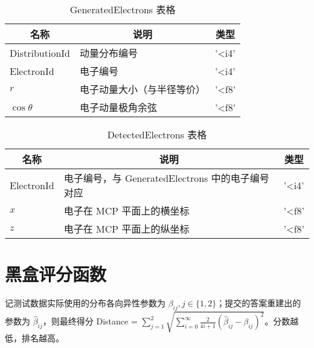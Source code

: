 \documentclass{article}
\begin{document}
\begin{table}[H]
    \caption{GeneratedElectrons 表格}
        \label{tab:GeneratedElectrons2}
        \centering
        {
            \begin{tabular}[c]{l|l|l}
                \hline
                \multicolumn{1}{c|}{\textbf{名称}} & 
                \multicolumn{1}{c|}{\textbf{说明}} & 
                \multicolumn{1}{c}{\textbf{类型}} \\
                \hline
                DistributionId & 动量分布编号 & '<i4' \\
                ElectronId & 电子编号 & '<i4' \\
                $r$ & 电子动量大小（与半径等价） & '<f8' \\
                $\cos\theta$ & 电子动量极角余弦 & '<f8' \\
                \hline
            \end{tabular}
        }
\end{table}

\begin{table}[H]
    \caption{DetectedElectrons 表格}
        \label{tab:DetectedElectrons2}
        \centering
        {
            \begin{tabular}[c]{l|l|l}
                \hline
                \multicolumn{1}{c|}{\textbf{名称}} & 
                \multicolumn{1}{c|}{\textbf{说明}} & 
                \multicolumn{1}{c}{\textbf{类型}} \\
                \hline
                ElectronId & 电子编号，与 GeneratedElectrons 中的电子编号对应 & '<i4' \\
                $x$ & 电子在 MCP 平面上的横坐标 & '<f8' \\
                $z$ & 电子在 MCP 平面上的纵坐标 & '<f8' \\
                \hline
            \end{tabular}
        }
\end{table}




\section{黑盒评分函数} %
\label{sec:黑盒评分函数}
记测试数据实际使用的分布各向异性参数为 $\beta_{ij}, j\in \{1,2\}$；提交的答案重建出的参数为 $\hat{\beta}_{ij}$，则最终得分 Distance = $\displaystyle\sum_{j=1}^{2}\sqrt{\sum_{i=0}^{\infty} \frac{2}{4i+1} \left( \hat{\beta}_{ij} - \beta_{ij} \right)^2}$。分数越低，排名越高。
\end{document}
